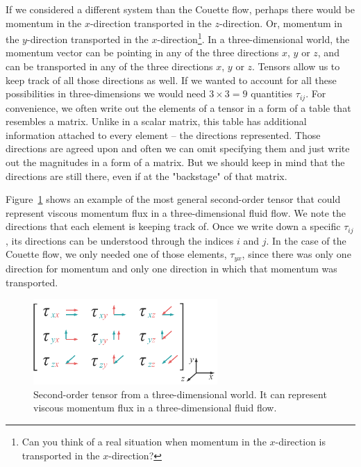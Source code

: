 \documentclass[10pt,twocolumn]{article}
\begin{document}
If we considered a different system than the Couette flow, perhaps there would be momentum in the $x$-direction transported in the $z$-direction. Or, momentum in the $y$-direction transported in the $x$-direction\footnote{Can you think of a real situation when momentum in the $x$-direction is transported in the $x$-direction?}. In a three-dimensional world, the momentum vector can be pointing in any of the three directions $x$, $y$ or $z$, and can be transported in any of the three directions $x$, $y$ or $z$. Tensors allow us to keep track of all those directions as well. If we wanted to account for all these possibilities in three-dimensions we would need $3 \times 3 = 9$ quantities $\tau_{ij}$. For convenience, we often write out the elements of a tensor in a form of a table that resembles a matrix. Unlike in a scalar matrix, this table has additional information attached to every element -- the directions represented. Those directions are agreed upon and often we can omit specifying them and just write out the magnitudes in a form of a matrix. But we should keep in mind that the directions are still there, even if at the "backstage" of that matrix.

Figure~\ref{fig:tensor-in-matrix-form} shows an example of the most general second-order tensor that could represent viscous momentum flux in a three-dimensional fluid flow. We note the directions that each element is keeping track of. Once we write down a specific $\tau_{ij}$, its directions can be understood through the indices $i$ and $j$. In the case of the Couette flow, we only needed one of those elements, $\tau_{yx}$, since there was only one direction for momentum and only one direction in which that momentum was transported.

\begin{figure}[t!]
\centering\includegraphics[width=7cm]{second-order-tensor-matrix-form.pdf}
\caption{Second-order tensor from a three-dimensional world. It can represent viscous momentum flux in a three-dimensional fluid flow.}
\label{fig:tensor-in-matrix-form}
\end{figure}

\end{document}
